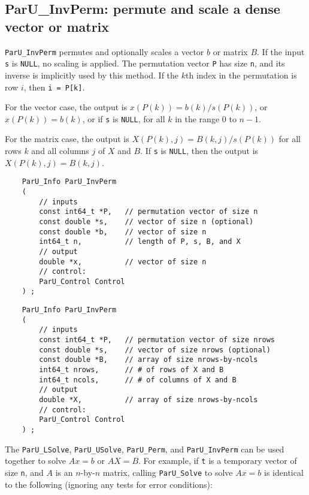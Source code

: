 \documentclass[12pt]{article}
\begin{document}
\subsection{{\sf ParU\_InvPerm}: permute and scale a dense vector or matrix}
\label{invperm}

    \verb'ParU_InvPerm' permutes and optionally scales a vector $b$ or matrix
    $B$.  If the input \verb's' is \verb'NULL', no scaling is applied.  The
    permutation vector \verb'P' has size \verb'n', and its inverse is
    implicitly used by this method.  If the $k$th index in the permutation is
    row $i$, then \verb'i = P[k]'.

    For the vector case, the output is $x(P(k)) = b(k) / s(P(k))$, or
    $x(P(k)) = b(k)$, or if \verb's' is \verb'NULL', for all $k$ in the range 0
    to $n-1$.

    For the matrix case, the output is $X(P(k),j) = B(k,j) / s(P(k))$ for all
    rows $k$ and all columns $j$ of $X$ and $B$.  If \verb's' is \verb'NULL',
    then the output is $X(P(k),j) = B(k,j)$.

    {\footnotesize
    \begin{verbatim}
    ParU_Info ParU_InvPerm
    (
        // inputs
        const int64_t *P,   // permutation vector of size n
        const double *s,    // vector of size n (optional)
        const double *b,    // vector of size n
        int64_t n,          // length of P, s, B, and X
        // output
        double *x,          // vector of size n
        // control:
        ParU_Control Control
    ) ; \end{verbatim} }

    {\footnotesize
    \begin{verbatim}
    ParU_Info ParU_InvPerm
    (
        // inputs
        const int64_t *P,   // permutation vector of size nrows
        const double *s,    // vector of size nrows (optional)
        const double *B,    // array of size nrows-by-ncols
        int64_t nrows,      // # of rows of X and B
        int64_t ncols,      // # of columns of X and B
        // output
        double *X,          // array of size nrows-by-ncols
        // control:
        ParU_Control Control
    ) ; \end{verbatim} }

    The \verb'ParU_LSolve', \verb'ParU_USolve', \verb'ParU_Perm', and
    \verb'ParU_InvPerm' can be used together to solve $Ax=b$ or $AX=B$.  For
    example, if \verb't' is a temporary vector of size \verb'n', and $A$ is an
    $n$-by-$n$ matrix, calling \verb'ParU_Solve' to solve $Ax=b$ is identical
    to the following (ignoring any tests for error conditions):
\end{document}
